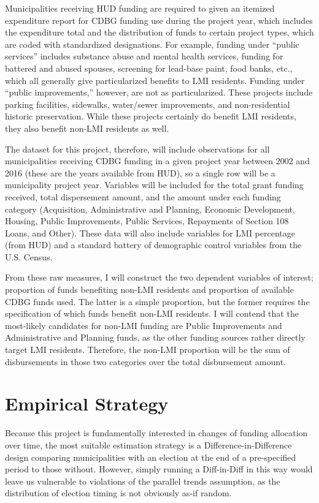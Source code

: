 \documentclass[12pt,a4paper]{article}
\begin{document}
\par Municipalities receiving HUD funding are required to given an itemized expenditure report for CDBG funding use during the project year, which includes the expenditure total and the distribution of funds to certain project types, which are coded with standardized designations. For example, funding under ``public services'' includes substance abuse and mental health services, funding for battered and abused spouses, screening for lead-base paint, food banks, etc., which all generally give particularized benefits to LMI residents. Funding under ``public improvements,'' however, are not as particularized. These projects include parking facilities, sidewalks, water/sewer improvements, and non-residential historic preservation. While these projects certainly do benefit LMI residents, they also benefit non-LMI residents as well.

\par The dataset for this project, therefore, will include observations for all municipalities receiving CDBG funding in a given project year between 2002 and 2016 (these are the years available from HUD), so a single row will be a municipality project year. Variables will be included for the total grant funding received, total dispersement amount, and the amount under each funding category (Acquisition, Administrative and Planning, Economic Development, Housing, Public Improvements, Public Services, Repayments of Section 108 Loans, and Other). These data will also include variables for LMI percentage (from HUD) and a standard battery of demographic control variables from the U.S. Census.

\par From these raw measures, I will construct the two dependent variables of interest; proportion of funds benefiting non-LMI residents and proportion of available CDBG funds used. The latter is a simple proportion, but the former requires the specification of which funds benefit non-LMI residents. I will contend that the most-likely candidates for non-LMI funding are Public Improvements and Administrative and Planning funds, as the other funding sources rather directly target LMI residents. Therefore, the non-LMI proportion will be the sum of disbursements in those two categories over the total disbursement amount.

\section{Empirical Strategy}
\par Because this project is fundamentally interested in changes of funding allocation over time, the most suitable estimation strategy is a Difference-in-Difference design comparing municipalities with an election at the end of a pre-specified period to those without. However, simply running a Diff-in-Diff in this way would leave us vulnerable to violations of the parallel trends assumption, as the distribution of election timing is not obviously as-if random. 
\end{document}
